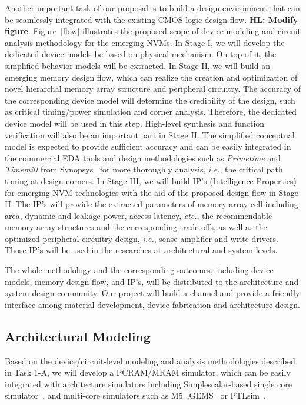 Another important task of our proposal is to build a design environment that can be seamlessly integrated with the existing CMOS logic design flow. \textbf{\underline{HL: Modify figure}}. Figure~\ref{flow} illustrates the proposed scope of device modeling and circuit analysis methodology for the emerging NVMs. In Stage I, we will develop the dedicated device models be based on physical mechanism. On top of it, the simplified behavior models will be extracted. In Stage II, we will build an emerging memory design flow, which can realize the creation and optimization of novel hierarchal memory array structure and peripheral circuitry. The accuracy of the corresponding device model will determine the credibility of the design, such as critical timing/power simulation and corner analysis. Therefore, the dedicated device model will be used in this step. High-level synthesis and function verification will also be an important part in Stage II. The simplified conceptual model is expected to provide sufficient accuracy and %
can be easily integrated in the commercial EDA tools and design methodologies such as \emph{Primetime} and \emph{Timemill} from Synopsys~\cite{synopsys} for more thoroughly analysis, \emph{i.e.}, the critical path timing at design corners. In Stage III, we will build IP's (Intelligence Properties) for emerging NVM technologies with the aid of the proposed design flow in Stage II. The IP's will provide the extracted parameters of memory array cell including area, dynamic and leakage power, access latency, \emph{etc.}, the recommendable memory array structures and the corresponding trade-offs, as well as the optimized peripheral circuitry design, \emph{i.e.}, sense amplifier and write drivers. Those IP's will be used in the researches at architectural and system levels.

The whole methodology and the corresponding outcomes, including device models, memory design flow, and IP's, will be distributed to the architecture and system design community. Our project will build a channel and provide a friendly interface among material development, device fabrication and architecture design.

\subsection{Architectural Modeling}

Based on the device/circuit-level modeling and analysis methodologies described in Task 1-A, we will develop a PCRAM/MRAM simulator, which can be easily integrated with architecture simulators including Simplescalar-based single core simulator~\cite{simplescalar:computer02,sim-alpha}, and multi-core simulators such as M5~\cite{3D:M5},GEMS~\cite{martin:can05} or PTLsim~\cite{PTLsim}.


